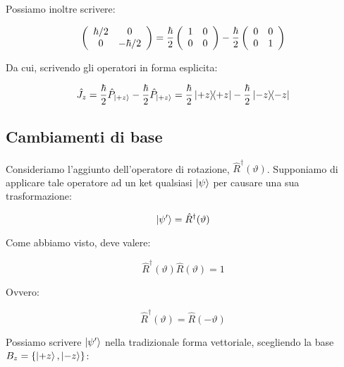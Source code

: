 Possiamo inoltre scrivere:

	\begin{equation}
		\left( \begin{array}{c c}
				\hbar / 2 & 0 \\
				0 &  - \hbar / 2 \\ 
			\end{array}
		\right ) =
		\frac{\hbar}{2}
		\left( \begin{array}{c c}
				1 & 0 \\
				0 & 0 \\ 
			\end{array}
		\right ) -
		\frac{\hbar}{2}
		\left( \begin{array}{c c}
				0 & 0 \\
				0 & 1 \\ 
			\end{array}
		\right )
	\end{equation}

Da cui, scrivendo gli operatori in forma esplicita:

	\begin{equation}
		\hat{J}_z = \frac{\hbar}{2} \hat{P}_{\ket{+z}} - \frac{\hbar}{2} \hat{P}_{\ket{+z}} = \frac{\hbar}{2} \ketbra{+z}{+z} - \frac{\hbar}{2} \ketbra{-z}{-z}
	\end{equation}

\subsection{Cambiamenti di base}

	Consideriamo l'aggiunto dell'operatore di rotazione, $\hat{R}^\dagger(\vartheta)$. Supponiamo di applicare tale operatore ad un ket qualsiasi $\ket{\psi}$ per causare una sua trasformazione:

	\[
		\ket{\psi'} = \hat{R}^\dagger(\vartheta)
	\]

Come abbiamo visto, deve valere:

	\begin{equation} \label{eq:rotationAdjoint}
		\hat{R}^\dagger(\vartheta) \hat{R}(\vartheta) = 1
	\end{equation}

Ovvero:

	\begin{equation}
		\hat{R}^\dagger(\vartheta) = \hat{R} ( -\vartheta )
	\end{equation}

Possiamo scrivere $\ket{\psi'}$ nella tradizionale forma vettoriale, scegliendo la base $B_z = \{ \ket{+z}, \ket{-z} \} $:

